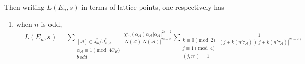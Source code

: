 \documentclass[11pt, reqno]{amsart}
\theoremstyle{plain}
\theoremstyle{definition}
\numberwithin{equation}{section}
\begin{document}
Then writing $L(E_{n},s)$ in terms of lattice points, one respectively has
\begin{enumerate}
    \item  when $n$ is odd,
\begin{align}
    &L(E_{n},s)=\sum_{\substack{[\mathcal{A}]\in J_{\mathfrak{m}}^{*}/J_{\mathfrak{m},\mathbb{Z}}^{*}\\\alpha_{\mathcal{A}}\equiv1\pmod{4\mathcal{O}_{K}}\\b\,odd}}\frac{\chi'_{n}(\alpha_{\mathcal{A}})\alpha_{\mathcal{A}}|\alpha_{\mathcal{A}}|^{2s-2}}{N(\mathcal{A})|N(\mathcal{A})|^{2s-2}}\sum_{\substack{k\equiv0\pmod{2}\\j\equiv1\pmod{4}\\(j,n')=1}}\frac{1}{(j+k(n'\tau_{\mathcal{A}}))|j+k(n'\tau_{\mathcal{A}})|^{2s-2}},\nonumber
\end{align}


\end{enumerate}
\end{document}
